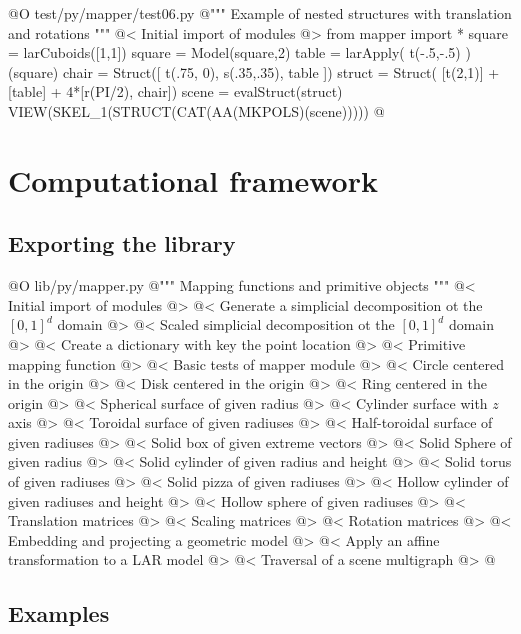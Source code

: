 \documentclass[11pt,oneside]{article}	%
\begin{document}
@O test/py/mapper/test06.py
@{""" Example of nested structures with translation and rotations """
@< Initial import of modules @>
from mapper import *
square = larCuboids([1,1])
square = Model(square,2)
table = larApply( t(-.5,-.5) )(square)
chair = Struct([ t(.75, 0), s(.35,.35), table ])
struct = Struct( [t(2,1)] + [table] + 4*[r(PI/2), chair])
scene = evalStruct(struct)
VIEW(SKEL_1(STRUCT(CAT(AA(MKPOLS)(scene)))))
@}

\section{Computational framework}
\subsection{Exporting the library}
@O lib/py/mapper.py
@{""" Mapping functions and primitive objects """
@< Initial import of modules @>
@< Generate a simplicial decomposition ot the $[0,1]^d$ domain @>
@< Scaled simplicial decomposition ot the $[0,1]^d$ domain @>
@< Create a dictionary with key the point location @>
@< Primitive mapping function @>
@< Basic tests of mapper module @>
@< Circle centered in the origin @>
@< Disk centered in the origin @>
@< Ring centered in the origin @>
@< Spherical surface of given radius @>
@< Cylinder surface with $z$ axis @>
@< Toroidal surface of given radiuses @>
@< Half-toroidal surface of given radiuses @>
@< Solid box of given extreme vectors @>
@< Solid Sphere of given radius @>
@< Solid cylinder of given radius and height @>
@< Solid torus of given radiuses @>
@< Solid pizza of given radiuses @>
@< Hollow cylinder of given radiuses and height @>
@< Hollow sphere of given radiuses @>
@< Translation matrices @>
@< Scaling matrices @>
@< Rotation matrices @>
@< Embedding and projecting a geometric model @>
@< Apply an affine transformation to a LAR model @>
@< Traversal of a scene multigraph @>
@}
\subsection{Examples}
\end{document}

